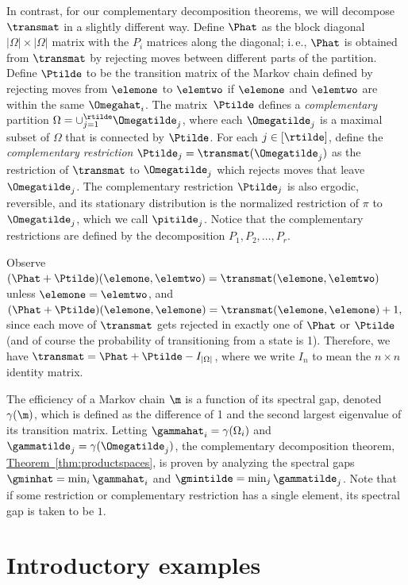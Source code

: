 \documentclass[11pt]{article}
\providecommand{\ie}{i.\,e.}
\providecommand{\expref}[2]{\texorpdfstring{\hyperref[#2]{#1~\ref{#2}}}{#1~\ref{#2}}}
\begin{document}
In contrast, for our complementary decomposition theorems,
we will decompose $\transmat$ in a slightly different way.
Define $\Phat$ as the block diagonal $|\Omega|\times |\Omega|$ matrix 
with the $P_i$ matrices along the diagonal; \ie,  $\Phat$ is 
obtained from $\transmat$ by rejecting moves between different parts of 
the partition.
Define $\Ptilde$ to be the transition matrix of the 
Markov chain defined by rejecting moves from $\elemone$ to $\elemtwo$ 
if $\elemone$ and $\elemtwo$ are within the same $\Omegahat_i$.  
The matrix~$\Ptilde$ 
defines a \emph{complementary} partition $\Omega = \cup_{j=1}^{\rtilde} 
\Omegatilde_j$, where each $\Omegatilde_j$ is a maximal subset of 
$\Omega$ that is connected 
by $\Ptilde$. For each $j\in [\rtilde]$, define the \emph{complementary 
restriction} $\Ptilde_{j} = \transmat(\Omegatilde_j)$ as the 
restriction of $\transmat$ to $\Omegatilde_j$ which rejects moves that 
leave $\Omegatilde_j$. The complementary restriction $\Ptilde_j$ is 
also ergodic, reversible, and its stationary distribution is the normalized restriction 
of $\pi$ to $\Omegatilde_j$, which we call $\pitilde_j$.
Notice that 
the complementary restrictions are defined by the decomposition 
$P_1,P_2,\ldots, P_r$.

Observe $(\Phat+\Ptilde)(\elemone,\elemtwo)=\transmat(\elemone,\elemtwo)$ 
unless $\elemone=\elemtwo$, and 
$(\Phat+\Ptilde)(\elemone,\elemone)=\transmat(\elemone,\elemone)+1,$ 
since each move of $\transmat$ gets rejected in exactly one of $\Phat$ 
or $\Ptilde$ (and of course the probability of transitioning from a 
state is 1).  Therefore, we have $\transmat = 
\Phat+\Ptilde-I_{|\Omega|}$, where we write $I_n$ to 
mean the $n \times n$ identity matrix. 

The efficiency of a Markov chain $\m$ is a function of its spectral 
gap, denoted $\gamma(\m)$, which is defined as the difference of 1 and 
the second largest eigenvalue of its transition matrix. Letting 
$\gammahat_i = \gamma(\Omega_i)$ and $\gammatilde_j = 
\gamma(\Omegatilde_j)$, the complementary decomposition theorem, 
\expref{Theorem}{thm:productspaces}, is proven by analyzing the spectral 
gaps $\gminhat=\min_i \gammahat_i$ and $\gmintilde=\min_j 
\gammatilde_j$.  Note that if some restriction or complementary 
restriction has a single element, its spectral gap is taken to be $1$.

\section{Introductory examples}\label{sec:decompThm} 
\end{document}
